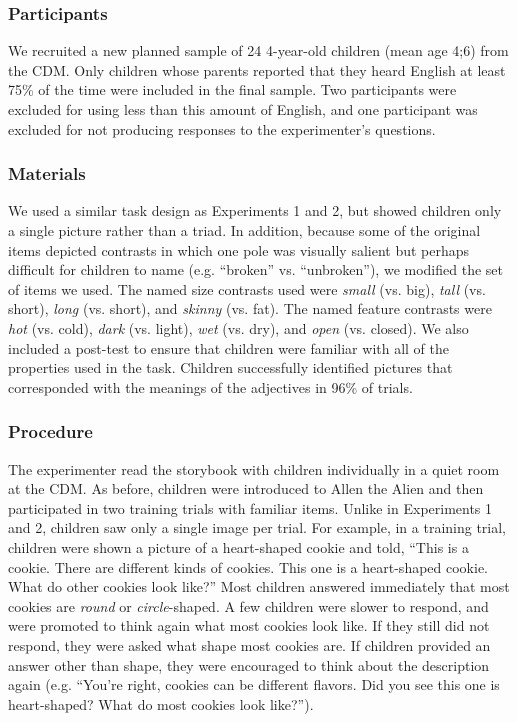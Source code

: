 \documentclass[man]{apa2}
\begin{document}
\subsubsection{Participants}

We recruited a new planned sample of 24 4-year-old children (mean age 4;6) from the CDM.  Only children whose parents reported that they heard English at least 75\% of the time were included in the final sample.  Two participants were excluded for using less than this amount of English, and one participant was excluded for not producing responses to the experimenter's questions.

\subsubsection{Materials}

We used a similar task design as Experiments 1 and 2, but showed children only a single picture rather than a triad.  In addition, because some of the original items depicted contrasts in which one pole was visually salient but perhaps difficult for children to name (e.g. ``broken'' vs. ``unbroken''), we modified the set of items we used.  The named size contrasts used were \emph{small} (vs. big), \emph{tall} (vs. short), \emph{long} (vs. short), and \emph{skinny} (vs. fat).  The named feature contrasts were \emph{hot} (vs. cold), \emph{dark} (vs. light), \emph{wet} (vs. dry), and \emph{open} (vs. closed).  We also included a post-test to ensure that children were familiar with all of the properties used in the task.  Children successfully identified pictures that corresponded with the meanings of the adjectives in 96\% of trials.

\subsubsection{Procedure}

The experimenter read the storybook with children individually in a quiet room at the CDM. As before, children were introduced to Allen the Alien and then participated in two training trials with familiar items. Unlike in  Experiments 1 and 2, children saw only a single image per trial. For example, in a training trial, children were shown a picture of a heart-shaped cookie and told, ``This is a cookie.  There are different kinds of cookies.  This one is a heart-shaped cookie.  What do other cookies look like?'' Most children answered immediately that most cookies are \emph{round} or \emph{circle}-shaped. A few children were slower to respond, and were promoted to think again what most cookies look like. If they still did not respond, they were asked what shape most cookies are.  If children provided an answer other than shape, they were encouraged to think about the description again (e.g. ``You're right, cookies can be different flavors. Did you see this one is heart-shaped?  What do most cookies look like?''). 
\end{document}
